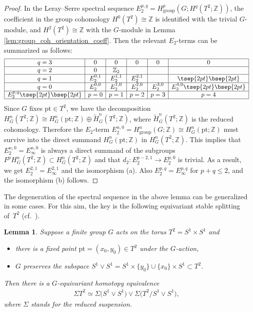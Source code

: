 \documentclass[pdftex]{sigma}
\newtheorem{lem}[thm]{Lemma}
\theoremstyle{definition}
\newcommand{\Z}{\mathbb{Z}}
\newcommand{\pt}{\mathrm{pt}}
\begin{document}
\begin{proof}
In the Leray--Serre spectral sequence
$E_2^{p, q} = H^p_{\mathrm{group}}(G; H^q(T^2; \Z))$, the coef\/f\/icient in the group cohomology $H^0(T^2) \cong \Z$ is identif\/ied with the trivial $G$-module, and $H^2(T^2) \cong \Z$ with the $G$-module in Lemma \ref{lem:group_coh_orientation_coeff}. Then the relevant $E_2$-terms can be summarized as follows:
$$
\begin{array}{|c|c|c|c|c|c|}
\hline
q = 3 & 0 & 0 & 0 & 0 & 0 \\
\hline
q = 2 & 0 & \Z_2 & & & \\
\hline
q = 1 & E_2^{0, 1} & E_2^{1, 1} & E_2^{2, 1} & & \tsep{2pt}\bsep{2pt}\\
\hline
q = 0 & E_2^{0, 0} & E_2^{1, 0} & E_2^{2, 0} & E_2^{3, 0} & E_2^{4, 0} \tsep{2pt}\bsep{2pt}\\
\hline
E_2^{p, q} \tsep{2pt}\bsep{2pt} & p = 0 & p = 1 & p = 2 & p = 3 & p = 4\\
\hline
\end{array}
$$
Since $G$ f\/ixes $\pt \in T^2$, we have the decomposition $H^n_G(T^2; \Z) \cong H^n_G(\pt; \Z) \oplus \tilde{H}^n_G(T^2; \Z)$, where $\tilde{H}^n_G(T^2; \Z)$ is the reduced cohomology. Therefore the $E_2$-term $E_2^{n, 0} = H^n_{\mathrm{group}}(G; \Z) \cong H^n_G(\pt; \Z)$ must survive into the direct summand $H^n_G(\pt; \Z)$ in $H^n_G(T^2; \Z)$. This implies that $E_2^{n, 0} = E_\infty^{n, 0}$ is always a direct summand of the subgroups $F^pH^n_G(T^2; \Z) \subset H^n_G(T^2; \Z)$ and that $d_2 \colon E_2^{p-2, 1} \to E_2^{p, 0}$ is trivial. As a result, we get $E_2^{2, 1} = E_\infty^{2, 1}$ and the isomorphism (a). Also $E_2^{p, q} = E_\infty^{p, q}$ for $p + q \le 2$, and the isomorphism (b) follows.
\end{proof}

The degeneration of the spectral sequence in the above lemma can be generalized in some cases. For this aim, the key is the following equivariant stable splitting of~$T^2$ (cf.\ \cite[Theorem~11.8]{F-M}).

\begin{lem} \label{lem:stable_splitting}
Suppose a finite group $G$ acts on the torus $T^2 = S^1 \times S^1$ and
\begin{itemize}\itemsep=0pt
\item there is a fixed point $\pt = (x_0, y_0) \in T^2$ under the $G$-action,

\item $G$ preserves the subspace $S^1 \vee S^1 = S^1 \times \{ y_0 \} \cup \{ x_0 \} \times S^1 \subset T^2$.
\end{itemize}
Then there is a $G$-equivariant homotopy equivalence
\begin{gather*}
\Sigma T^2 \simeq \Sigma\big(S^1 \vee S^1\big) \vee \Sigma \big(T^2/S^1\vee S^1\big),
\end{gather*}
where $\Sigma$ stands for the reduced suspension.
\end{lem}
\end{document}
